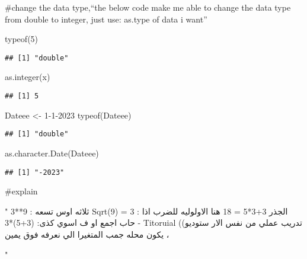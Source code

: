 \documentclass[
]{article}
\newenvironment{Shaded}{\begin{snugshade}}{\end{snugshade}}
\newcommand{\DecValTok}[1]{\textcolor[rgb]{0.00,0.00,0.81}{#1}}
\newcommand{\FunctionTok}[1]{\textcolor[rgb]{0.00,0.00,0.00}{#1}}
\newcommand{\NormalTok}[1]{#1}
\newcommand{\OtherTok}[1]{\textcolor[rgb]{0.56,0.35,0.01}{#1}}
\newcommand{\StringTok}[1]{\textcolor[rgb]{0.31,0.60,0.02}{#1}}
\begin{document}
\#change the data type,``the below code make me able to change the data
type from double to integer, just use: as.type of data i want''

\begin{Shaded}
\begin{Highlighting}[]
\FunctionTok{typeof}\NormalTok{(}\DecValTok{5}\NormalTok{)}
\end{Highlighting}
\end{Shaded}

\begin{verbatim}
## [1] "double"
\end{verbatim}

\begin{Shaded}
\begin{Highlighting}[]
\FunctionTok{as.integer}\NormalTok{(x)}
\end{Highlighting}
\end{Shaded}

\begin{verbatim}
## [1] 5
\end{verbatim}

\begin{Shaded}
\begin{Highlighting}[]
\NormalTok{Dateee }\OtherTok{\textless{}{-}} \DecValTok{1{-}1{-}2023}
\FunctionTok{typeof}\NormalTok{(Dateee)}
\end{Highlighting}
\end{Shaded}

\begin{verbatim}
## [1] "double"
\end{verbatim}

\begin{Shaded}
\begin{Highlighting}[]
\FunctionTok{as.character.Date}\NormalTok{(Dateee)}
\end{Highlighting}
\end{Shaded}

\begin{verbatim}
## [1] "-2023"
\end{verbatim}

\#explain

\begin{Shaded}
\begin{Highlighting}[]
\StringTok{"}
\StringTok{3**9 :}
\StringTok{ثلاثه اوس تسعه}
\StringTok{Sqrt(9) = 3 :}
\StringTok{الجذر}
\StringTok{3+3*5 = 18}
\StringTok{هنا الاولوليه للضرب}
\StringTok{اذا حاب اجمع او ف اسوي كذى:}
\StringTok{(3+5)*3}
\StringTok{{-}}
\StringTok{Titoruial ((تدريب عملي من نفس الار ستوديو ، يكون محله جمب المتغيرا الي نعرفه فوق يمين}

\StringTok{"}
\end{Highlighting}
\end{Shaded}
\end{document}
